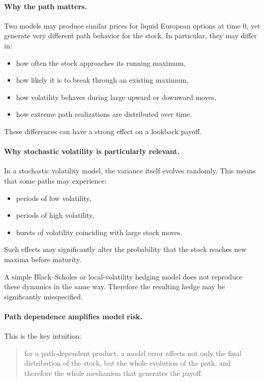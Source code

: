 \documentclass[11pt]{article}
\theoremstyle{plain}
\theoremstyle{definition}
\theoremstyle{remark}
\begin{document}
\paragraph{Why the path matters.}
Two models may produce similar prices for liquid European options at
time \(0\), yet generate very different path behavior for the stock.
In particular, they may differ in:
\begin{itemize}[leftmargin=1.4em]
    \item how often the stock approaches its running maximum,
    \item how likely it is to break through an existing maximum,
    \item how volatility behaves during large upward or downward moves,
    \item how extreme path realizations are distributed over time.
\end{itemize}

These differences can have a strong effect on a lookback payoff.

\paragraph{Why stochastic volatility is particularly relevant.}
In a stochastic volatility model, the variance itself evolves randomly.
This means that some paths may experience:
\begin{itemize}[leftmargin=1.4em]
    \item periods of low volatility,
    \item periods of high volatility,
    \item bursts of volatility coinciding with large stock moves.
\end{itemize}

Such effects may significantly alter the probability that the stock
reaches new maxima before maturity.

A simple Black--Scholes or local-volatility hedging model does not
reproduce these dynamics in the same way.
Therefore the resulting hedge may be significantly misspecified.

\paragraph{Path dependence amplifies model risk.}
This is the key intuition:
\begin{quote}
for a path-dependent product, a model error affects not only the final
distribution of the stock, but the whole evolution of the path, and
therefore the whole mechanism that generates the payoff.
\end{quote}
\end{document}
